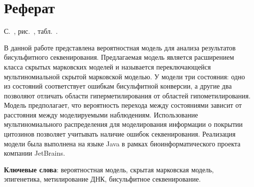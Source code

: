 
\thispagestyle{empty}

\section*{Реферат}

С.~\totalpages, рис.~\totalfigures, табл.~\totaltables.

В данной работе представлена вероятностная модель для анализа результатов
бисульфитного секвенирования. Предлагаемая модель является расширением
класса скрытых марковских моделей и называется переключающейся мультиномиальной
скрытой марковской моделью. У модели три состояния: одно из состояний соответствует
ошибкам бисульфитной конверсии, а другие два позволяют отличать области гиперметилирования
от областей гипометилирования. Модель предполагает, что вероятность перехода между
состояниями зависит от расстояния между моделируемыми наблюдениям. Использование
мультиномиального распределения для моделирования информации о покрытии
цитозинов позволяет учитывать наличие ошибок секвенирования. Реализация
модели была выполнена на языке Java в рамках биоинформатического проекта компании
JetBrains.

\textbf{Ключевые слова}: вероятностная модель, скрытая марковская модель,
эпигенетика, метилирование ДНК, бисульфитное секвенирование.

